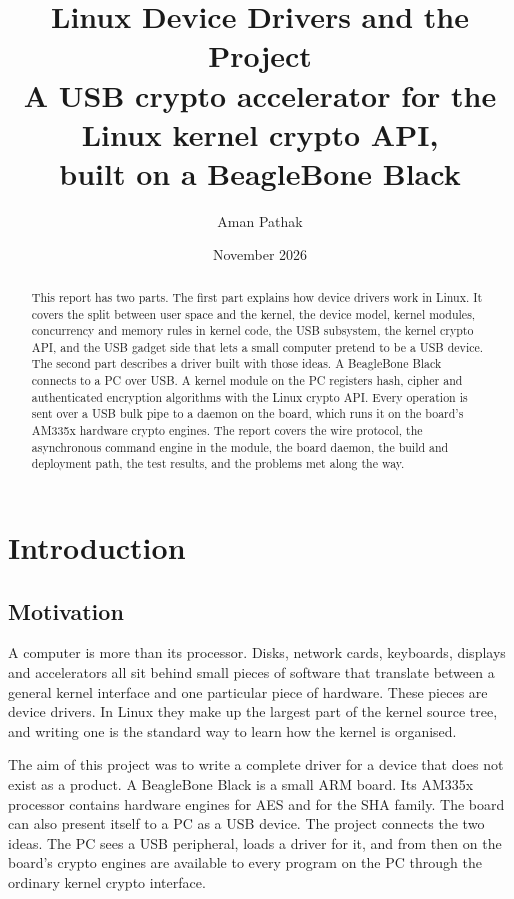 \documentclass[11pt,a4paper,oneside]{report}
\title{\textbf{Linux Device Drivers and the \proj{} Project}\\[6pt]
\large A USB crypto accelerator for the Linux kernel crypto API,\\
built on a BeagleBone Black}
\author{Aman Pathak}
\date{November 2026}
\begin{document}
\maketitle

\begin{abstract}
\noindent
This report has two parts. The first part explains how device drivers work in Linux. It covers the split between user space and the kernel, the device model, kernel modules, concurrency and memory rules in kernel code, the USB subsystem, the kernel crypto API, and the USB gadget side that lets a small computer pretend to be a USB device.
The second part describes a driver built with those ideas. A BeagleBone Black connects to a PC over USB. A kernel module on the PC registers hash, cipher and authenticated encryption algorithms with the Linux crypto API. Every operation is sent over a USB bulk pipe to a daemon on the board, which runs it on the board's AM335x hardware crypto engines. The report covers the wire protocol, the asynchronous command engine in the module, the board daemon, the build and deployment path, the test results, and the problems met along the way.
\end{abstract}

\tableofcontents
\listoffigures
\listoftables

\chapter{Introduction}

\section{Motivation}

A computer is more than its processor. Disks, network cards, keyboards, displays and accelerators all sit behind small pieces of software that translate between a general kernel interface and one particular piece of hardware. These pieces are device drivers. In Linux they make up the largest part of the kernel source tree, and writing one is the standard way to learn how the kernel is organised.

The aim of this project was to write a complete driver for a device that does not exist as a product. A BeagleBone Black is a small ARM board. Its AM335x processor contains hardware engines for AES and for the SHA family. The board can also present itself to a PC as a USB device. The project connects the two ideas. The PC sees a USB peripheral, loads a driver for it, and from then on the board's crypto engines are available to every program on the PC through the ordinary kernel crypto interface.
\end{document}

